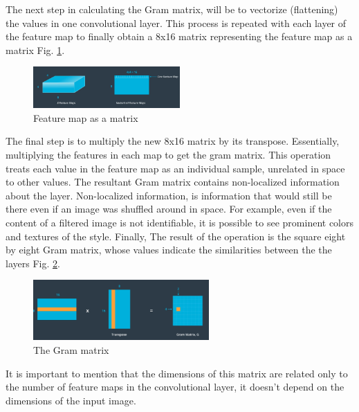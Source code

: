 \documentclass{article}
\begin{document}
The next step in calculating the Gram matrix, will be to vectorize (flattening) the values in one convolutional layer. This process is repeated with each layer of the feature map to finally obtain a 8x16 matrix representing the feature map as a matrix Fig. \ref{fig:f7}.

\begin{figure}[ht]
    \centering
    \includegraphics[width=0.5\textwidth,height=0.5\textheight,keepaspectratio]{images/f_map.png}
    \captionsetup{justification=centering}
    \caption{Feature map as a matrix}
    \label{fig:f7}
\end{figure}

The final step is to multiply the new 8x16 matrix by its transpose. Essentially, multiplying the features in each map to get the gram matrix. This operation treats each value in the feature map as an individual sample, unrelated in space to other values. The resultant Gram matrix contains non-localized information about the layer. Non-localized information, is information that would still be there even if an image was shuffled around in space. For example, even if the content of a filtered image is not identifiable, it is possible to see prominent colors and textures of the style. Finally, The result of the operation is the square eight by eight Gram matrix, whose values indicate the similarities between the the layers Fig. \ref{fig:f8}.

\begin{figure}[ht]
    \centering
    \includegraphics[width=0.6\textwidth,height=0.6\textheight,keepaspectratio]{images/gram.png}
    \captionsetup{justification=centering}
    \caption{The Gram matrix}
    \label{fig:f8}
\end{figure}

It is important to mention that the dimensions of this matrix are related only to the number of feature maps in the convolutional layer, it doesn't depend on the dimensions of the input image.
\end{document}
